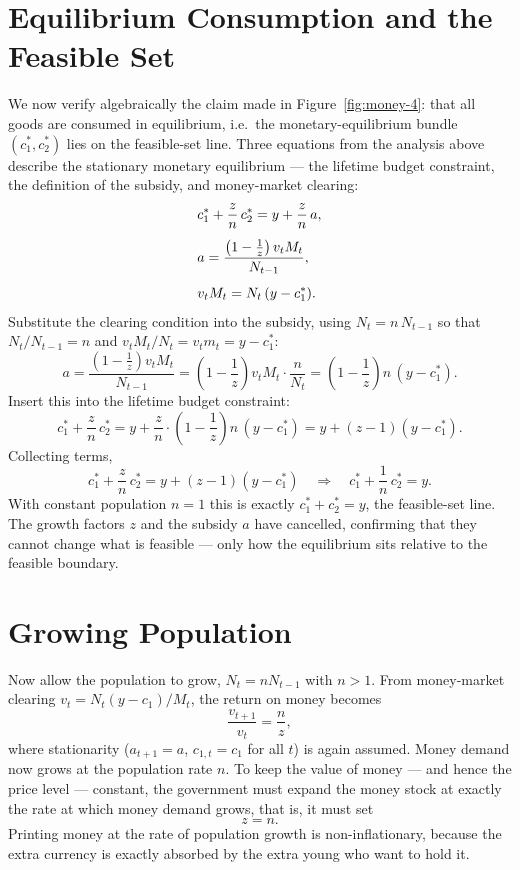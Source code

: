\section{Equilibrium Consumption and the Feasible Set}
\label{sec:feasible-algebra}

We now verify algebraically the claim made in Figure~\ref{fig:money-4}: that all goods are consumed in equilibrium, i.e.\ the monetary-equilibrium bundle $(c_1^*,c_2^*)$ lies on the feasible-set line. Three equations from the analysis above describe the stationary monetary equilibrium --- the lifetime budget constraint, the definition of the subsidy, and money-market clearing:
\[
\begin{aligned}
&c_1^* + \frac{z}{n}\,c_2^* = y + \frac{z}{n}\,a, \\[4pt]
&a = \frac{\left(1 - \tfrac{1}{z}\right) v_t M_t}{N_{t-1}}, \\[4pt]
&v_t M_t = N_t\,(y - c_1^*).
\end{aligned}
\]
Substitute the clearing condition into the subsidy, using $N_t = n\,N_{t-1}$ so that $N_t/N_{t-1}=n$ and $v_t M_t / N_t = v_t m_t = y - c_1^*$:
\[
a = \frac{\left(1 - \tfrac{1}{z}\right) v_t M_t}{N_{t-1}}
  = \left(1 - \frac{1}{z}\right) v_t M_t \cdot \frac{n}{N_t}
  = \left(1 - \frac{1}{z}\right) n\,(y - c_1^*).
\]
Insert this into the lifetime budget constraint:
\[
c_1^* + \frac{z}{n}\,c_2^*
 = y + \frac{z}{n}\cdot \left(1 - \frac{1}{z}\right) n\,(y - c_1^*)
 = y + (z-1)(y - c_1^*).
\]
Collecting terms,
\[
c_1^* + \frac{z}{n}\,c_2^* = y + (z-1)(y - c_1^*)
\quad\Longrightarrow\quad
c_1^* + \frac{1}{n}\,c_2^* = y .
\]
With constant population $n=1$ this is exactly $c_1^* + c_2^* = y$, the feasible-set line. The growth factors $z$ and the subsidy $a$ have cancelled, confirming that they cannot change what is feasible --- only how the equilibrium sits relative to the feasible boundary.

\section{Growing Population}

Now allow the population to grow, $N_t = n N_{t-1}$ with $n > 1$. From money-market clearing $v_t = N_t(y-c_1)/M_t$, the return on money becomes
\[
\frac{v_{t+1}}{v_t} = \frac{n}{z},
\]
where stationarity ($a_{t+1}=a$, $c_{1,t}=c_1$ for all $t$) is again assumed. Money demand now grows at the population rate $n$. To keep the value of money --- and hence the price level --- constant, the government must expand the money stock at exactly the rate at which money demand grows, that is, it must set
\[
z = n .
\]
Printing money at the rate of population growth is non-inflationary, because the extra currency is exactly absorbed by the extra young who want to hold it.

